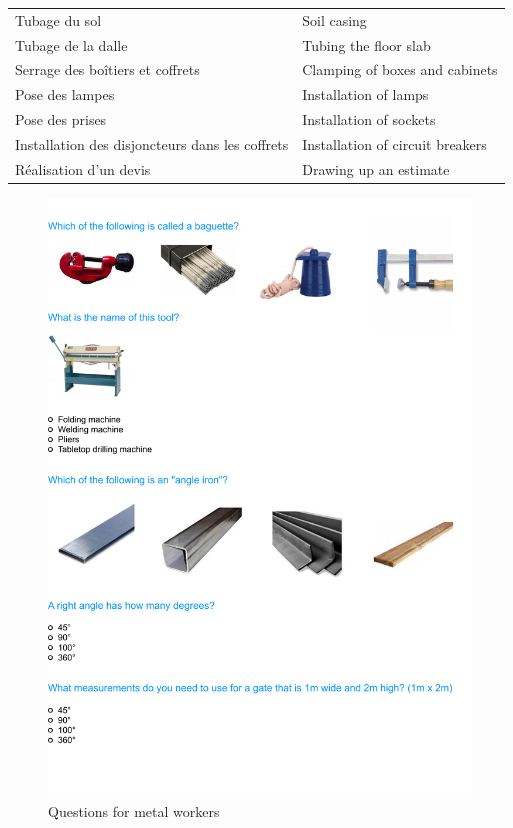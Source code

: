 \documentclass[
  a4paper, twoside, 12pt]{book}
\begin{document}
\begin{longtable}[]{@{}
  >{\raggedright\arraybackslash}p{}
  >{\raggedright\arraybackslash}p{}@{}}
Tubage du sol & Soil casing \\
Tubage de la dalle & Tubing the floor slab \\
Serrage des boîtiers et coffrets & Clamping of boxes and cabinets \\
Pose des lampes & Installation of lamps \\
Pose des prises & Installation of sockets \\
Installation des disjoncteurs dans les coffrets & Installation of circuit breakers \\
Réalisation d'un devis & Drawing up an estimate \\
\end{longtable}

\begin{singlespacing}

\begin{figure}[H]
\includegraphics{figures/questionnaire/metalworking} \caption{\label{fig:metalworkers}Questions for metal workers}\label{fig:unnamed-chunk-6}
\end{figure}


\end{singlespacing}
\end{document}
